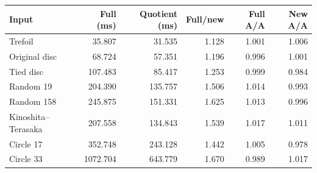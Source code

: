 \begin{tabular}{lrrrrr}
\toprule
Input & Full (ms) & Quotient (ms) & Full/new & Full A/A & New A/A \\
\midrule
Trefoil & 35.807 & 31.535 & 1.128 & 1.001 & 1.006 \\
Original disc & 68.724 & 57.351 & 1.196 & 0.996 & 1.001 \\
Tied disc & 107.483 & 85.417 & 1.253 & 0.999 & 0.984 \\
Random 19 & 204.390 & 135.757 & 1.506 & 1.014 & 0.993 \\
Random 158 & 245.875 & 151.331 & 1.625 & 1.013 & 0.996 \\
Kinoshita--Terasaka & 207.558 & 134.843 & 1.539 & 1.017 & 1.011 \\
Circle 17 & 352.748 & 243.128 & 1.442 & 1.005 & 0.978 \\
Circle 33 & 1072.704 & 643.779 & 1.670 & 0.989 & 1.017 \\
\bottomrule
\end{tabular}
